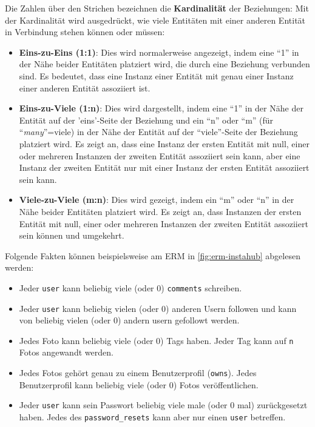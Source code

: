 Die Zahlen über den Strichen bezeichnen die \textbf{Kardinalität} der Beziehungen: Mit der Kardinalität wird ausgedrückt, wie viele Entitäten mit einer anderen Entität in Verbindung stehen können oder müssen:
\begin{itemize}
  \item \textbf{Eins-zu-Eins (1:1)}: Dies wird normalerweise angezeigt, indem eine ``1'' in der Nähe beider Entitäten platziert wird, die durch eine Beziehung verbunden sind. Es bedeutet, dass eine Instanz einer Entität mit genau einer Instanz einer anderen Entität assoziiert ist.
  \item \textbf{Eins-zu-Viele (1:n)}: Dies wird dargestellt, indem eine ``1'' in der Nähe der Entität auf der 'eins'-Seite der Beziehung und ein ``n'' oder ``m'' (für ``\textit{many}''=viele) in der Nähe der Entität auf der ``viele''-Seite der Beziehung platziert wird. Es zeigt an, dass eine Instanz der ersten Entität mit null, einer oder mehreren Instanzen der zweiten Entität assoziiert sein kann, aber eine Instanz der zweiten Entität nur mit einer Instanz der ersten Entität assoziiert sein kann.
  \item \textbf{Viele-zu-Viele (m:n)}: Dies wird gezeigt, indem ein ``m'' oder ``n'' in der Nähe beider Entitäten platziert wird. Es zeigt an, dass Instanzen der ersten Entität mit null, einer oder mehreren Instanzen der zweiten Entität assoziiert sein können und umgekehrt.
\end{itemize}

Folgende Fakten können beispielsweise am \gls{ERM} in \cref{fig:erm-instahub} abgelesen werden:
\begin{itemize}
  \item Jeder \texttt{user} kann beliebig viele (oder 0) \texttt{comments} schreiben.
  \item Jeder \texttt{user} kann beliebig vielen (oder 0) anderen Usern followen und kann von beliebig vielen (oder 0) andern usern gefollowt werden.
  \item Jedes Foto kann beliebig viele (oder 0) Tags haben. Jeder Tag kann auf \texttt{n} Fotos angewandt werden.
  \item Jedes Fotos gehört genau zu einem Benutzerprofil (\texttt{owns}). Jedes Benutzerprofil kann beliebig viele (oder 0) Fotos veröffentlichen.
  \item Jeder \texttt{user} kann sein Passwort beliebig viele male (oder 0 mal) zurückgesetzt haben. Jedes des \texttt{password\_resets} kann aber nur einen \texttt{user} betreffen.
\end{itemize}


